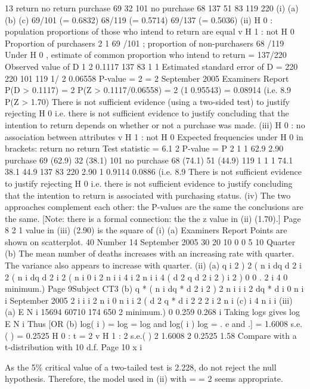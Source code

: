 \documentclass[a4paper,12pt]{article}
\begin{document}
13
return
no return
purchase
69
32
101
no purchase
68
137
51
83
119
220
(i) (a)
(b)
(c)
69/101 (= 0.6832)
68/119 (= 0.5714)
69/137 (= 0.5036)
(ii) H 0 : population proportions of those who intend to return are equal
v H 1 : not H 0
Proportion of purchasers
2
1
69 /101 ; proportion of non-purchasers
68 /119
Under H 0 , estimate of common proportion who intend to return = 137/220
Observed value of D
1
2
0.1117
137 83 1
1
Estimated standard error of D =
220 220 101 119
1/ 2
0.06558
P-value = 2
= 2
September 2005
Examiners Report
P(D > 0.1117) = 2 P(Z > 0.1117/0.06558) = 2
(1 0.95543) = 0.08914 (i.e. 8.9%
P(Z > 1.70)
There is not sufficient evidence (using a two-sided test) to justify rejecting H 0 i.e. there is not sufficient evidence to justify concluding that the intention to return depends on whether or not a purchase was made.
(iii)
H 0 : no association between attributes v H 1 : not H 0
Expected frequencies under H 0 in brackets:
return
no return
Test statistic = 6.1 2
P-value = P
2
1
1
62.9
2.90
purchase
69 (62.9)
32 (38.1)
101
no purchase
68 (74.1)
51 (44.9)
119
1
1
1
74.1 38.1 44.9
137
83
220
2.90
1 0.9114 0.0886 (i.e. 8.9%
There is not sufficient evidence to justify rejecting H 0 i.e. there is not sufficient evidence to justify concluding that the intention to return is associated with purchasing status.
(iv)
The two approaches complement each other:
the P-values are the same
the conclusions are the same.
[Note: there is a formal connection: the
the z value in (ii) (1.70).]
Page 8
2
1 value
in (iii) (2.90) is the square of
(i)
(a)
Examiners Report
Points are shown on scatterplot.
40
Number
14
September 2005
30
20
10
0
0
5
10
Quarter
(b)
The mean number of deaths increases with an increasing rate with
quarter.
The variance also appears to increase with quarter.
(ii)
(a)
q
i 2 ) 2
( n i
dq
d
2 i 2 ( n i
dq
d
2 i 2 ( n i
0
i 2 n i
i 4
i 2 n i
i 4
(
d 2 q
d
2
i 2 )
i 2 ) 0
0
.
2 i 4
0
minimum.)
Page 9Subject CT3 
(b)
q * ( n i
dq *
d 2
i 2 ) 2
n i
i
i 2
dq *
d
i
0
n i
i
September 2005
2
i
i
i 2
n i
0
n i
i 2
(
d 2 q *
d
i 2
2
2
i 2 n i
(c)
i
4
n i
i
(iii)
(a)
E N i
15694
60710
174
650
2
minimum.)
0
0.259
0.268
i
Taking logs gives
log E N i
Thus
[OR
(b)
log( i ) = log
= log and
log( i ) log
= .
e and
.]
= 1.6008 s.e.( ) = 0.2525
H 0 :
t
= 2 v H 1 :
2
s.e.( )
2
1.6008 2
0.2525
1.58
Compare with a t-distribution with 10 d.f.
Page 10
x i

As the 5\% critical value of a two-tailed test is 2.228, do not reject the null hypothesis.
Therefore, the model used in (ii) with
=
= 2 seems appropriate.
\end{document}
